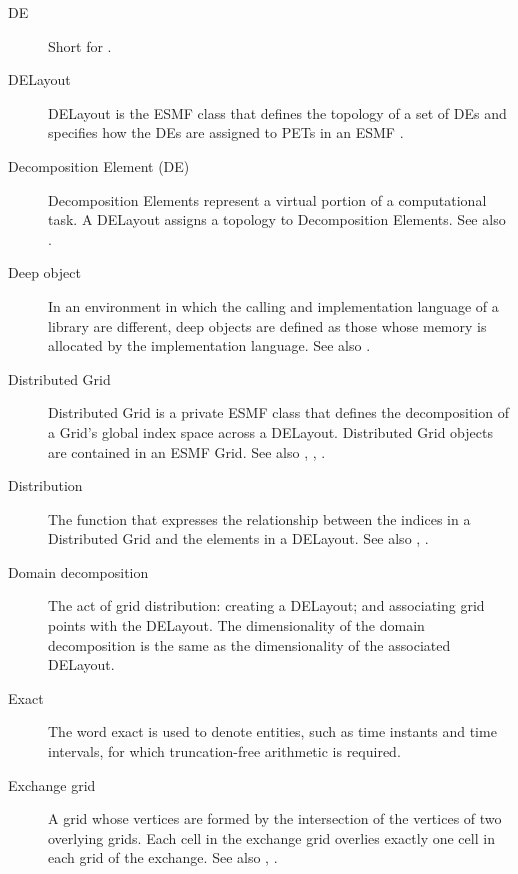 \begin{description}
\label{glos:DE}
\item[DE] 
  Short for .

\label{glos:DELayout}
\item[DELayout] DELayout is the ESMF class that
  defines the topology of a set of DEs and specifies 
  how the DEs are assigned to PETs in an ESMF  
  . 

\label{glos:Decomp_Element}
\item[Decomposition Element (DE)]
  Decomposition Elements represent a 
  virtual portion of a computational task.
  A DELayout assigns a topology to Decomposition Elements.
  See also .

\label{glos:DeepObjects}
\item[Deep object] In an environment
  in which the calling and implementation language of a library are
  different, deep objects are defined as those whose memory is 
  allocated by the implementation language. 
  See also . 

\label{glos:DistGrid}
\item[Distributed Grid]
  Distributed Grid is a private ESMF class that defines the 
  decomposition of a Grid's global index space across a DELayout.
  Distributed Grid objects are contained in an ESMF Grid. 
  See also , ,
  .

\label{glos:Distribution}
\item[Distribution] The function that expresses
  the relationship between the indices in a Distributed Grid and the elements 
  in a DELayout. See also , 
  . 

\label{glos:DomainDecomp}
\item[Domain decomposition] The act of grid 
  distribution: creating a DELayout; and associating grid points with 
  the DELayout.  The dimensionality of the domain decomposition is the 
  same as the dimensionality of the associated DELayout.

\label{glos:Exact}
\item [Exact] The word exact is used
  to denote entities, such as time instants and time intervals, for 
  which truncation-free arithmetic is required. 

\label{glos:ExchangeGrid}
\item[Exchange grid] A grid whose vertices are
  formed by the intersection of the vertices of two overlying grids.  Each 
  cell in the exchange grid overlies exactly one cell in each grid of the 
  exchange. See also , .


\end{description}
